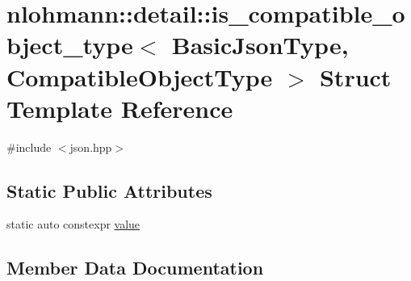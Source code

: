 \hypertarget{structnlohmann_1_1detail_1_1is__compatible__object__type}{}\section{nlohmann\+:\+:detail\+:\+:is\+\_\+compatible\+\_\+object\+\_\+type$<$ Basic\+Json\+Type, Compatible\+Object\+Type $>$ Struct Template Reference}
\label{structnlohmann_1_1detail_1_1is__compatible__object__type}


{\ttfamily \#include $<$json.\+hpp$>$}

\subsection*{Static Public Attributes}
\begin{DoxyCompactItemize}
\item 
static auto constexpr \hyperlink{structnlohmann_1_1detail_1_1is__compatible__object__type_a87cce7bcdcd22cc8517f171705f6a7c7}{value}
\end{DoxyCompactItemize}


\subsection{Member Data Documentation}
